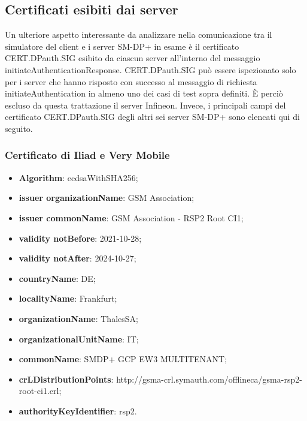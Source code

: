 \documentclass[10pt, oneside]{book}
\begin{document}
\subsection{Certificati esibiti dai server}
Un ulteriore aspetto interessante da analizzare nella comunicazione tra il simulatore del client e i server SM-DP+ in esame è il certificato CERT.DPauth.SIG esibito da ciascun server all'interno del messaggio initiateAuthenticationResponse. CERT.DPauth.SIG può essere ispezionato solo per i server che hanno risposto con successo al messaggio di richiesta initiateAuthentication in almeno uno dei casi di test sopra definiti. È perciò escluso da questa trattazione il server Infineon. Invece, i principali campi del certificato CERT.DPauth.SIG degli altri sei server SM-DP+ sono elencati qui di seguito.

\subsubsection{Certificato di Iliad e Very Mobile}
\begin{itemize}
\item \textbf{Algorithm}: ecdsaWithSHA256;
\item \textbf{issuer organizationName}: GSM Association;
\item \textbf{issuer commonName}: GSM Association - RSP2 Root CI1;
\item \textbf{validity notBefore}: 2021-10-28;
\item \textbf{validity notAfter}: 2024-10-27;
\item \textbf{countryName}: DE;
\item \textbf{localityName}: Frankfurt;
\item \textbf{organizationName}: ThalesSA;
\item \textbf{organizationalUnitName}: IT;
\item \textbf{commonName}: SMDP+ GCP EW3 MULTITENANT;
\item \textbf{crLDistributionPoints}: http://gsma-crl.symauth.com/offlineca/gsma-rsp2-root-ci1.crl;
\item \textbf{authorityKeyIdentifier}: rsp2.
\end{itemize}
\end{document}
